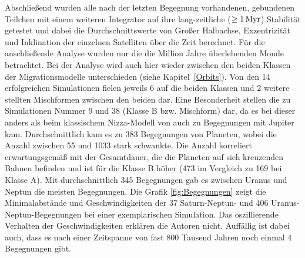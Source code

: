 \documentclass[12pt,a4paper,twoside]{article}
\renewcommand{\cite}{\citep}
\newcommand{\refsec}[1]{siehe Kapitel~\ref{#1}}
\begin{document}
Abschließend wurden alle nach der letzten Begegnung vorhandenen, gebundenen Teilchen mit einem weiteren Integrator %
auf ihre lang-zeitliche ($\geq \unit[1]{Myr}$) Stabilität getestet %
und dabei die Durchschnittswerte von Großer Halbachse, Exzentrizität und Inklination der einzelnen Satelliten über die Zeit berechnet.
Für die anschließende Analyse wurden nur die die Million Jahre überlebenden Monde betrachtet\cite{Nesvorny2007}. %
Bei der Analyse wird auch hier wieder zwischen den beiden Klassen der Migrationsmodelle unterschieden (\refsec{Orbits}).
Von den 14 erfolgreichen Simulationen fielen jeweils 6 auf die beiden Klassen und 2 weitere stellten Mischformen zwischen den beiden dar. Eine Besonderheit stellen die zu Simulationen Nummer 9 und 38 (Klasse B bzw. Mischform) dar, da es bei dieser anders als beim klassischem Nizza-Modell von \cite{Tsiganis2005} auch zu Begegnungen mit Jupiter kam.
Durchschnittlich kam es zu 383 Begegnungen von Planeten, wobei die Anzahl zwischen 55 und 1033 stark schwankte.
Die Anzahl korreliert erwartungsgemäß mit der Gesamtdauer, die die Planeten auf sich kreuzenden Bahnen befinden und ist für die Klasse B höher (473 im Vergleich zu 169 bei Klasse A).
Mit durchschnittlich 345 Begegnungen gab es zwischen Uranus und Neptun die meisten Begegnungen\cite{Nesvorny2007}. %
Die Grafik \ref{fig:Begegnungen} zeigt die Minimalabstände und Geschwindigkeiten der 37 Saturn-Neptun- und 406 Uranus-Neptun-Begegnungen bei einer exemplarischen Simulation.
Das oszillierende Verhalten der Geschwindigkeiten erklären die Autoren nicht.
Auffällig ist dabei auch, dass es nach einer Zeitspanne von fast 800 Tausend Jahren noch einmal 4 Begegnungen gibt\cite{Nesvorny2007}.
\end{document}
